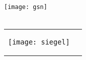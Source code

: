 \begin{titlepage}
\null\vfill
\begin{center}
\large
\sffamily

{\Large\spacedlowsmallcaps{\mySubTitle}} \\
\vspace{1cm}
\texttt{[image: gsn]}\\
\bigskip
\vspace{2cm}
{\huge\spacedlowsmallcaps{\myTitle} \\
}

\bigskip
    
\vspace{5cm}

\begin{tabular} {cc}
\parbox{0.5\textwidth}{\texttt{[image: siegel]}}
&
\parbox{1\textwidth}{

					{\normalsize
					
					\myGroup \\
					\myUrl \\
					\myTime}}
					

			\end{tabular}
\end{center}
\vfill
\end{titlepage}



